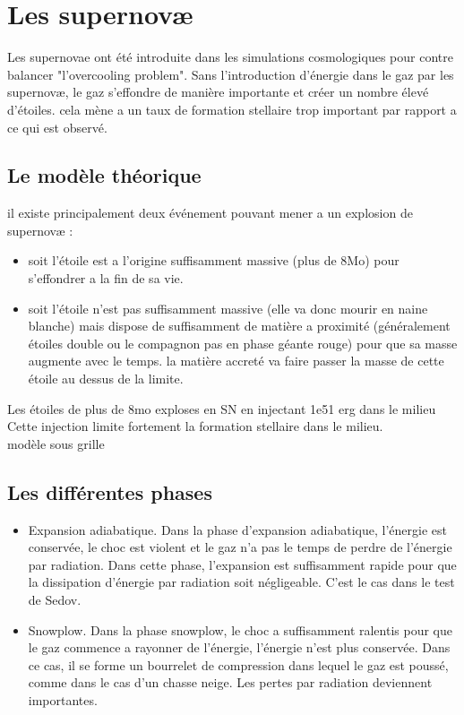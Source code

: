 \clearpage
\section{Les supernovæ}


Les supernovae ont été introduite dans les simulations cosmologiques pour contre balancer "l'overcooling problem".
Sans l'introduction d'énergie dans le gaz par les supernovæ, le gaz s'effondre de manière importante et créer un nombre élevé d'étoiles.
cela mène a un taux de formation stellaire trop important par rapport a ce qui est observé.



\subsection{Le modèle théorique}
il existe principalement deux événement pouvant mener a un explosion de supernovæ : 

\begin{itemize}
\item soit l'étoile est a l'origine suffisamment massive (plus de 8Mo) pour s'effondrer a la fin de sa vie.
\item soit l'étoile n'est pas suffisamment massive (elle va donc mourir en naine blanche) mais dispose de suffisamment de matière a proximité (généralement étoiles double ou le compagnon pas en phase géante rouge) pour que sa masse augmente avec le temps.
la matière accreté va faire passer la masse de cette étoile au dessus de la limite.
\end{itemize}

Les étoiles de plus de 8mo exploses en SN en injectant 1e51 erg dans le milieu\\
Cette injection limite fortement la formation stellaire dans le milieu.\\
modèle sous grille\\
 
\subsection{Les différentes phases}

\begin{itemize}
\item Expansion adiabatique.
Dans la phase d'expansion adiabatique, l'énergie est conservée, le choc est violent et le gaz n'a pas le temps de perdre de l'énergie par radiation.
Dans cette phase, l'expansion est suffisamment rapide pour que la dissipation d'énergie par radiation soit négligeable.
C'est le cas dans le test de Sedov.

\item Snowplow.
Dans la phase snowplow, le choc a suffisamment ralentis pour que le gaz commence a rayonner de l'énergie, l'énergie n'est plus conservée.
Dans ce cas, il se forme un bourrelet de compression dans lequel le gaz est poussé, comme dans le cas d'un chasse neige. 
Les pertes par radiation deviennent importantes. 
\end{itemize}

